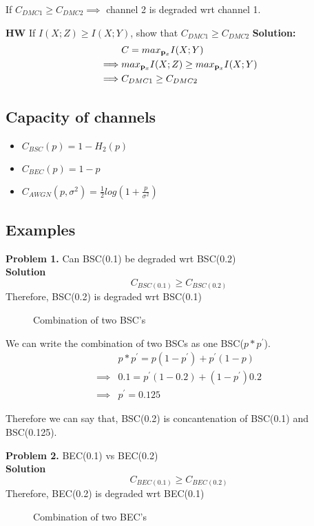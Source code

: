 \documentclass{article}
\begin{document}
If $C_{DMC1} \geq C_{DMC2} \implies$ channel 2 is degraded wrt channel 1.

\textbf{HW} If $I(X;Z) \geq I(X;Y)$, show that $C_{DMC1} \geq C_{DMC2}$ \newline
\textbf{Solution:}
\begin{align}
    & C = max_{\mathbf p_x} I(X;Y)  \\
    \implies & max_{\mathbf p_x}I(X;Z) \geq max_{\mathbf p_x}I(X;Y) \\
     \implies & C_{DMC1} \geq C_{DMC2}
\end{align}

\subsection{Capacity of channels}

\begin{itemize}
    \item $C_{BSC}(p) = 1 - H_2(p)$
    \item $C_{BEC}(p) = 1 - p$
    \item $C_{AWGN}(p, \sigma^2) =  \frac{1}{2}log(1 + \frac{p}{\sigma^2})$
\end{itemize}

\subsection{Examples}
\textbf{Problem 1.} Can BSC(0.1) be degraded wrt BSC(0.2) \\
\textbf{Solution} $$C_{BSC(0.1)} \ge C_{BSC(0.2)}$$
Therefore, BSC(0.2) is degraded wrt BSC(0.1)

\begin{figure}[!ht]
    \centering
    
    \caption{Combination of two BSC's}
    \label{fig:bsc}
\end{figure}

We can write the combination of two BSCs as one BSC($p \ast p^{'}$).
\begin{align}
    & p \ast p^{'} = p(1-p^{'}) + p^{'}(1-p) \\
    \implies & 0.1 = p^{'}(1-0.2) + (1-p^{'})0.2  \\
    \implies & p^{'} = 0.125
\end{align}

Therefore we can say that, BSC(0.2) is concantenation of BSC(0.1) and BSC(0.125).

\textbf{Problem 2.} BEC(0.1) vs BEC(0.2)\\
\textbf{Solution} $$C_{BEC(0.1)} \ge C_{BEC(0.2)}$$
Therefore, BEC(0.2) is degraded wrt BEC(0.1)
\begin{figure}[!ht]
    \centering
    
    \caption{Combination of two BEC's}
    \label{fig:bec}
\end{figure}
\end{document}

